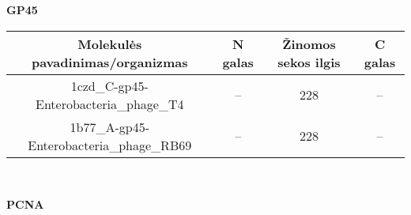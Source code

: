 \documentclass[a4paper,12pt]{article}
\begin{document}
\vspace{1cm}
\large\textbf{GP45}
\normalsize

\begin{frame}
\centering
\hspace*{-2cm}
\begin{tabular}{|c|c|c|c|} \hline
\textbf{ Molekulės pavadinimas/organizmas } & \textbf{N galas} &  
\textbf{Žinomos sekos ilgis} &  \textbf{C galas} 					\\ \hline

1czd\_C-gp45-Enterobacteria\_phage\_T4 & -- & 228 & -- 				\\ \hline

1b77\_A-gp45-Enterobacteria\_phage\_RB69 & -- & 228 & -- 				\\ \hline
\end{tabular} 
\end{frame}\\

\clearpage

\large\textbf{PCNA}
\normalsize
\end{document}
